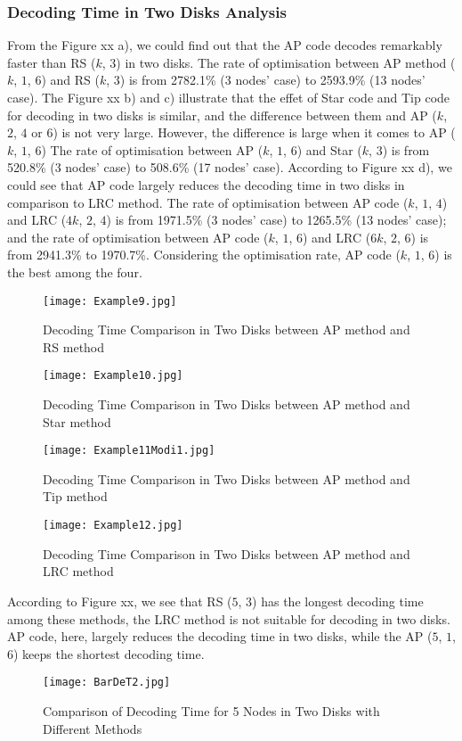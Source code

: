 \subsubsection{Decoding Time in Two Disks Analysis}
From the Figure xx a), we could find out that the AP code decodes remarkably faster than RS ($k$, $3$) in two disks. The rate of optimisation between AP method ($k$, $1$, $6$) and RS ($k$, $3$) is from 2782.1\% (3 nodes’ case) to 2593.9\% (13 nodes’ case). The Figure xx b) and c) illustrate that the effet of Star code and Tip code for decoding in two disks is similar, and the difference between them and AP ($k$, $2$, $4$ or $6$) is not very large. However, the difference is large when it comes to AP ($k$, $1$, $6$) The rate of optimisation between AP ($k$, $1$, $6$) and Star ($k$, $3$) is from 520.8\% (3 nodes’ case) to 508.6\% (17 nodes’ case). According to Figure xx d), we could see that AP code largely reduces the decoding time in two disks in comparison to LRC method. The rate of optimisation between AP code ($k$, $1$, $4$) and LRC ($4k$, $2$, $4$) is from 1971.5\% (3 nodes’ case) to 1265.5\% (13 nodes’ case); and the rate of optimisation between AP code ($k$, $1$, $6$) and LRC ($6k$, $2$, $6$) is from 2941.3\% to 1970.7\%. Considering the optimisation rate, AP code ($k$, $1$, $6$) is the best among the four.\par

\begin{figure}[H]
\begin{minipage}{0.25\lineWidth}
\centering
\texttt{[image: Example9.jpg]}
\caption{Decoding Time Comparison in Two Disks between AP method and RS method}
\end{minipage}
\begin{minipage}{0.25\lineWidth}
\centering
\texttt{[image: Example10.jpg]}
\caption{Decoding Time Comparison in Two Disks between AP method and Star method}
\end{minipage}
\begin{minipage}{0.25\lineWidth}
\centering
\texttt{[image: Example11Modi1.jpg]}
\caption{Decoding Time Comparison in Two Disks between AP method and Tip method}
\end{minipage}
\begin{minipage}{0.25\lineWidth}
\centering
\texttt{[image: Example12.jpg]}
\caption{Decoding Time Comparison in Two Disks between AP method and LRC method}
\end{minipage}
\end{figure}\par

According to Figure xx, we see that RS ($5$, $3$) has the longest decoding time among these methods, the LRC method is not suitable for decoding in two disks. AP code, here, largely reduces the decoding time in two disks, while the AP ($5$, $1$, $6$) keeps the shortest decoding time.
\begin{figure}[H]
\centering
\texttt{[image: BarDeT2.jpg]}
\caption{Comparison of Decoding Time for 5 Nodes in Two Disks with Different Methods}
\end{figure}
